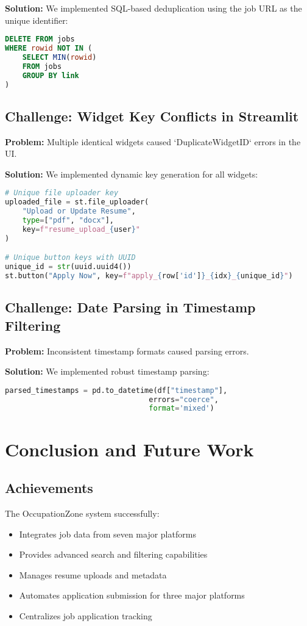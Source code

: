 \documentclass[12pt,a4paper]{report}
\begin{document}
\textbf{Solution:} We implemented SQL-based deduplication using the job URL as the unique identifier:

\begin{lstlisting}[language=SQL, caption=Deduplication SQL]
DELETE FROM jobs
WHERE rowid NOT IN (
    SELECT MIN(rowid)
    FROM jobs
    GROUP BY link
)
\end{lstlisting}

\section{Challenge: Widget Key Conflicts in Streamlit}
\textbf{Problem:} Multiple identical widgets caused `DuplicateWidgetID` errors in the UI.

\textbf{Solution:} We implemented dynamic key generation for all widgets:

\begin{lstlisting}[language=Python, caption=Dynamic Widget Keys]
# Unique file uploader key
uploaded_file = st.file_uploader(
    "Upload or Update Resume", 
    type=["pdf", "docx"], 
    key=f"resume_upload_{user}"
)

# Unique button keys with UUID
unique_id = str(uuid.uuid4())
st.button("Apply Now", key=f"apply_{row['id']}_{idx}_{unique_id}")
\end{lstlisting}

\section{Challenge: Date Parsing in Timestamp Filtering}
\textbf{Problem:} Inconsistent timestamp formats caused parsing errors.

\textbf{Solution:} We implemented robust timestamp parsing:

\begin{lstlisting}[language=Python, caption=Robust Timestamp Parsing]
parsed_timestamps = pd.to_datetime(df["timestamp"], 
                                 errors="coerce", 
                                 format='mixed')
\end{lstlisting}

\chapter{Conclusion and Future Work}

\section{Achievements}
The OccupationZone system successfully:
\begin{itemize}
    \item Integrates job data from seven major platforms
    \item Provides advanced search and filtering capabilities
    \item Manages resume uploads and metadata
    \item Automates application submission for three major platforms
    \item Centralizes job application tracking
\end{itemize}
\end{document}
